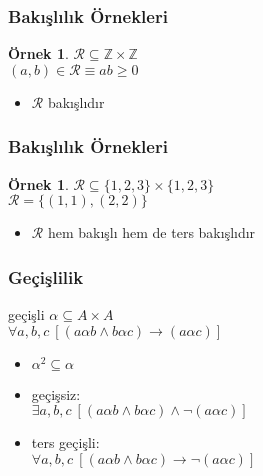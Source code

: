\documentclass[dvipsnames]{beamer}
\theoremstyle{definition}
\theoremstyle{example}
\newtheorem{ornek}[theorem]{Örnek}
\theoremstyle{plain}
\begin{document}
\begin{frame}
  \frametitle{Bakışlılık Örnekleri}

  \begin{ornek}
    $\mathcal{R} \subseteq \mathbb{Z} \times \mathbb{Z}$\\
    $(a,b) \in \mathcal{R} \equiv ab \geq 0$

    \medskip
    \begin{itemize}
      \item $\mathcal{R}$ bakışlıdır
    \end{itemize}
  \end{ornek}
\end{frame}

\begin{frame}
  \frametitle{Bakışlılık Örnekleri}

  \begin{ornek}
    $\mathcal{R} \subseteq \{1,2,3\} \times \{1,2,3\}$\\
    $\mathcal{R} = \{(1,1), (2,2)\}$

    \begin{itemize}
      \item $\mathcal{R}$ hem bakışlı hem de ters bakışlıdır
    \end{itemize}
  \end{ornek}
\end{frame}

\begin{frame}
  \frametitle{Geçişlilik}

  \begin{block}{geçişli}
    $\alpha \subseteq A \times A$\\
    $\forall a,b,c~[(a \alpha b \wedge b \alpha c) \rightarrow (a \alpha c)]$
  \end{block}

  \pause
  \begin{itemize}
    \item $\alpha^2 \subseteq \alpha$

    \pause
    \medskip
    \item geçişsiz:\\
      $\exists a,b,c~[(a \alpha b \wedge b \alpha c) \wedge \neg (a \alpha c)]$

    \pause
    \item ters geçişli:\\
      $\forall a,b,c~[(a \alpha b \wedge b \alpha c) \rightarrow \neg (a \alpha c)]$
  \end{itemize}
\end{frame}
\end{document}

